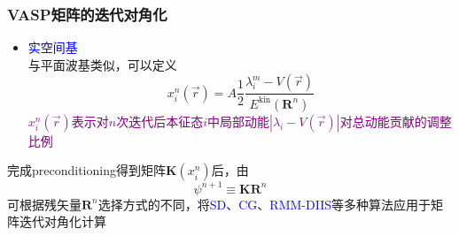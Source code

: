 {\frame
{
	\frametitle{\textrm{VASP}矩阵的迭代对角化}
	\begin{itemize}
		\item \textcolor{blue}{实空间基}\\
		与平面波基类似，可以定义
	\begin{displaymath}
		x_i^n(\vec r)=A\dfrac12\dfrac{\lambda_i^m-V(\vec r)}{E^{\mathrm{kin}}(\mathbf{R}^n)}
	\end{displaymath}
		\textcolor{purple}{$x_i^n(\vec r)$表示对$n$次迭代后本征态$i$中局部动能$|\lambda_i-V(\vec r)|$对总动能贡献的调整比例}
	\end{itemize}
	完成\textrm{preconditioning}得到矩阵$\mathbf{K}(x_i^n)$后，由
	\begin{displaymath}
		\psi^{n+1}\equiv\mathbf{K}\mathbf{R}^n
	\end{displaymath}
	可根据残矢量$\mathbf{R}^n$选择方式的不同，将\textcolor{blue}{\textrm{SD}、\textrm{CG}}、\textcolor{blue}{\textrm{RMM-DIIS}}等多种算法应用于矩阵迭代对角化计算
}

		\frame[allowframebreaks]
{
\frametitle{主要参考文献}


\section{附录:~\rm{AtomPAW}的赝势\rm{Data set}的生成}
\frame
{
	\frametitle{\textrm{AtomPAW}程序包简介}
	\textrm{AtomPAW}程序包是由\textrm{Holzwarth}、\textrm{Tackett}和\textrm{Matthews}开发的\textrm{PAW}原子数据集生成程序，主要基于基于\textrm{Bl\"ochl}提出的原子数据集生成方案。

}}}
